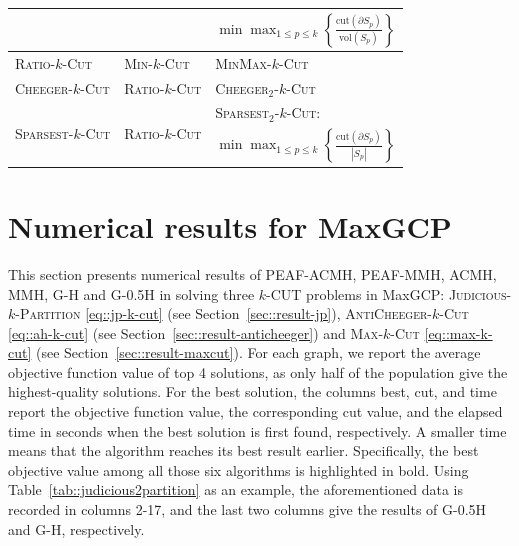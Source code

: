 \documentclass[12pt, a4paper]{article}%
\newcommand{\cut}{\mathrm{cut}}
\newcommand{\vol}{\mathrm{vol}}
\numberwithin{equation}{section}
\theoremstyle{plain}
\begin{document}
\begin{table}[htbp]
\begin{tabular}{|lll|}
					&                                & $\min\max_{1\leq p\leq k} \left\{\frac{\cut(\partial S_p)}{\vol(S_p)}\right\}$                        \\ \hline
					\textsc{Ratio}-$k$-\textsc{Cut}                         & \textsc{Min}-$k$-\textsc{Cut}                    & \textsc{MinMax}-$k$-\textsc{Cut}          \\ \hline
					\textsc{Cheeger}-$k$-\textsc{Cut}                       & \textsc{Ratio}-$k$-\textsc{Cut}                  & 	\textsc{Cheeger}$_2$-$k$-\textsc{Cut}      \\ \hline
					\multirow{2}{*}{\textsc{Sparsest}-$k$-\textsc{Cut}}     & \multirow{2}{*}{\textsc{Ratio}-$k$-\textsc{Cut}} & 	\textsc{Sparsest}$_2$-$k$-\textsc{Cut}:     \\
					&                                & $\min\max_{1\leq p\leq k} \left\{\frac{\cut(\partial S_p)}{|S_p|}\right\}$                        \\ \hline
				\end{tabular}
			\end{table}
			
			
			\section{Numerical results for MaxGCP}
			
			
			This section presents numerical results of PEAF-ACMH, PEAF-MMH, ACMH, MMH, G-H and G-0.5H in solving three $k$-CUT problems in MaxGCP: \textsc{Judicious}-$k$-\textsc{Partition} \eqref{eq::jp-k-cut} (see Section~\ref{sec::result-jp}),  \textsc{AntiCheeger}-$k$-\textsc{Cut} \eqref{eq::ah-k-cut} (see Section~\ref{sec::result-anticheeger})
			and  \textsc{Max}-$k$-\textsc{Cut} \eqref{eq::max-k-cut} (see Section~\ref{sec::result-maxcut}). For each graph, we report the average objective function value of top 4 solutions, as only half of the population give the highest-quality solutions. {For the best solution, the columns best, cut, and time report the objective
function value, the corresponding cut value, and the elapsed time in seconds
when the best solution is first found, respectively. A smaller time means that
the algorithm reaches its best result earlier.}            
            Specifically, the best objective value among all those six algorithms is highlighted in bold. Using Table~\ref{tab::judicious2partition} as an example, the aforementioned data is recorded in columns 2-17, and the last two columns give the results of G-0.5H and G-H, respectively.
			
\end{document}

